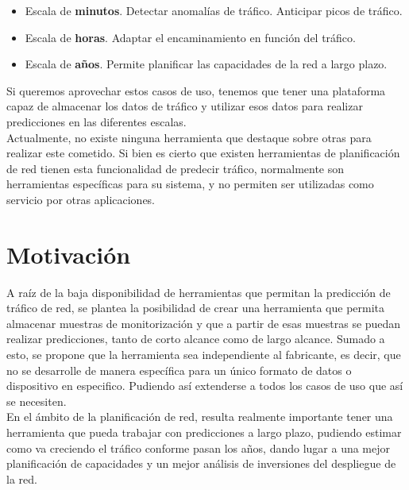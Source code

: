 \documentclass[a4paper, oneside, 12pt]{book}
\begin{document}
	\begin{itemize}
		\item Escala de \textbf{minutos}. Detectar anomalías de tráfico. Anticipar picos de tráfico.
		
		\item Escala de \textbf{horas}. Adaptar el encaminamiento en función del tráfico.
		
		\item Escala de \textbf{años}. Permite planificar las capacidades de la red a largo plazo.
	\end{itemize}
	
	\noindent Si queremos aprovechar estos casos de uso, tenemos que tener una plataforma capaz de almacenar los datos de tráfico y utilizar esos datos para realizar predicciones en las diferentes escalas. \\
	
	\noindent Actualmente, no existe ninguna herramienta que destaque sobre otras para realizar este cometido. Si bien es cierto que existen herramientas de planificación de red tienen esta funcionalidad de predecir tráfico, normalmente son herramientas específicas para su sistema, y no permiten ser utilizadas como servicio por otras aplicaciones.
	
	
	\section{Motivación}
	
	\noindent A raíz de la baja disponibilidad de herramientas que permitan la predicción de tráfico de red, se plantea la posibilidad de crear una herramienta que permita almacenar muestras de monitorización y que a partir de esas muestras se puedan realizar predicciones, tanto de corto alcance como de largo alcance. Sumado a esto, se propone que la herramienta sea independiente al fabricante, es decir, que no se desarrolle de manera específica para un único formato de datos o dispositivo en especifico. Pudiendo así extenderse a todos los casos de uso que así se necesiten. \\
	
	\noindent En el ámbito de la planificación de red, resulta realmente importante tener una herramienta que pueda trabajar con predicciones a largo plazo, pudiendo estimar como va creciendo el tráfico conforme pasan los años, dando lugar a una mejor planificación de capacidades y un mejor análisis de inversiones del despliegue de la red. \\
	
\end{document}
